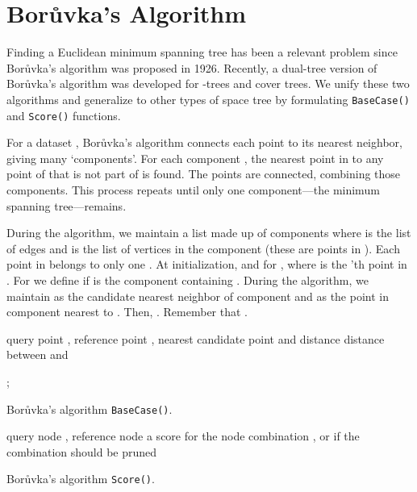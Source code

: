 \documentclass{article}
\begin{document}
\vspace*{-2em}
\section{Bor\r{u}vka's Algorithm}
\label{sec:dtb}


\vspace*{-0.3em}
Finding a Euclidean minimum spanning tree has been a relevant problem since
Bor\r{u}vka's algorithm was proposed in 1926.  Recently, a dual-tree
version of Bor\r{u}vka's algorithm was developed \cite{march2010} for -trees
and cover trees.  We unify these two algorithms and generalize to other types of
space tree by formulating \texttt{BaseCase()} and \texttt{Score()} functions.

\vspace*{-0.3em}
For a dataset , Bor\r{u}vka's algorithm connects each
point to its nearest neighbor, giving many `components'.  For each component
, the nearest point in  to any point of  that is not part of  is
found.  The points are connected, combining those components.  This process
repeats until only one component---the minimum spanning tree---remains.

\vspace*{-0.3em}
During the algorithm, we maintain a list  made up of  components  where  is the list of edges and  is the list of vertices
in the component  (these are points in ).  Each point in  belongs
to only one .  At initialization,  and  for , where  is the
'th point in .  For  we define  if  is the
component containing .  During the algorithm, we maintain  as the
candidate nearest neighbor of component  and  as the point in
component  nearest to .  Then, .
Remember that .

\begin{algorithm}[t!]
\begin{algorithmic}
     query point , reference point , nearest
candidate point  and distance 
     distance  between  and 

    \medskip
    \IF{}
      \RETURN 
    \ENDIF
    \IF{ \AND }
      \STATE 
      \STATE ;  
    \ENDIF
    \RETURN 
  \end{algorithmic}

  \caption{Bor\r{u}vka's algorithm \texttt{BaseCase()}.}
  \label{alg:dtb_base_case}
\end{algorithm}

\begin{algorithm}[t]
  \begin{algorithmic}
     query node , reference node 
     a score for the node combination , or  if the combination should be pruned

    \medskip

    \IF{}
      \IF{}
        \RETURN 
      \ENDIF
      \RETURN 
    \ENDIF

    \RETURN 
  \end{algorithmic}

  \caption{Bor\r{u}vka's algorithm \texttt{Score()}.}
  \label{alg:dtb_score}
\end{algorithm}
\end{document}
